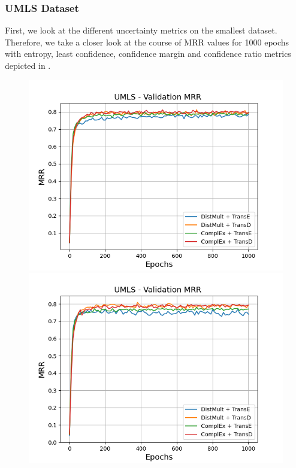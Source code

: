\subsubsection{UMLS Dataset}
\label{subsubsec:metrics_umls}
%
First, we look at the different uncertainty metrics on the smallest \umls dataset.
Therefore, we take a closer look at the course of MRR values for 1000 epochs with entropy, least confidence, confidence margin and confidence ratio metrics depicted in .
\begin{figure}
    \centering
    \begin{minipage}{.5\textwidth}
      \centering
      \includegraphics[width=0.9\linewidth]{figures/results/gan_train/not_pretrained/uncertainty/max_distribution/entropy/umls/1k_epochs/uncertainty_umls_mrrs.png}
    \end{minipage}%
    \begin{minipage}{.5\textwidth}
      \centering
      \includegraphics[width=0.9\linewidth]{figures/results/gan_train/not_pretrained/uncertainty/max_distribution/least_confidence/umls/uncertainty_umls_mrrs.png}

\end{minipage}
\end{figure}
